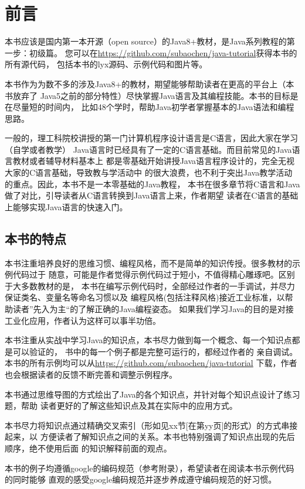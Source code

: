 \frontmatter
\chapter{前言}
本书应该是国内第一本开源（open source）的Java8+教材，是Java系列教程的第一步：初级篇。
您可以在\url{https://github.com/subaochen/java-tutorial}获得本书的所有源代码，
包括本书的lyx源码、示例代码和图片等。

本书作为为数不多的涉及Java8+的教材，期望能够帮助读者在更高的平台上（本书放弃了
Java5之前的部分特性）尽快掌握Java语言及其编程技能。本书的目标是在尽量短的时间内，
比如48个学时，帮助Java初学者掌握基本的Java语法和编程思路。

一般的，理工科院校讲授的第一门计算机程序设计语言是C语言，因此大家在学习（自学或者教学）
Java语言时已经具有了一定的C语言基础。而目前常见的Java语言教材或者辅导材料基本上
都是零基础开始讲授Java语言程序设计的，完全无视大家的C语言基础，导致教与学活动中
的很大浪费，也不利于突出Java教学活动的重点。因此，本书不是一本零基础的Java教程，
本书在很多章节将C语言和Java做了对比，引导读者从C语言转换到Java语言上来，作者期望
读者在C语言的基础上能够实现Java语言的快速入门。

\section*{本书的特点}
本书注重培养良好的思维习惯、编程风格，而不是简单的知识传授。很多教材的示例代码过于
随意，可能是作者觉得示例代码过于短小，不值得精心雕琢吧。区别于大多数教材的是，
本书在编写示例代码时，全部经过作者的一手调试，并尽力保证类名、变量名等命名习惯以及
编程风格(包括注释风格)接近工业标准，以帮助读者”先入为主“的了解正确的Java编程姿态。
如果我们学习Java的目的是对接工业化应用，作者认为这样可以事半功倍。

本书注重从实战中学习Java的知识点，本书尽力做到每一个概念、每一个知识点都是可以验证的，
书中的每一个例子都是完整可运行的，都经过作者的
亲自调试。本书的所有示例均可以从\url{https://github.com/subaochen/java-tutorial}
下载，作者也会根据读者的反馈不断完善和调整示例程序。

本书通过思维导图的方式绘出了Java的各个知识点，并针对每个知识点设计了练习题，帮助
读者更好的了解这些知识点及其在实际中的应用方式。

本书尽力将知识点通过精确交叉索引（形如见xx节[在第yy页]的形式）的方式串接起来，以
方便读者了解知识点之间的关系。本书也特别强调了知识点出现的先后顺序，绝不使用后面
的知识解释前面的观点。

本书的例子均遵循google的编码规范（参考附录），希望读者在阅读本书示例代码的同时能够
直观的感受google编码规范并逐步养成遵守编码规范的好习惯。

